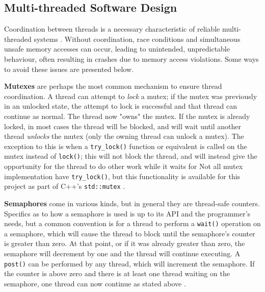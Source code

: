 \documentclass[11pt, a4paper, twocolumn]{article}
\begin{document}
\subsection{Multi-threaded Software Design}

Coordination between threads is a necessary characteristic of reliable multi-threaded systems \citep{Powell}. Without coordination, race conditions and simultaneous unsafe memory accesses can occur, leading to unintended, unpredictable behaviour, often resulting in crashes due to memory access violations. Some ways to avoid these issues are presented below.

\textbf{Mutexes} are perhaps the most common mechanism to ensure thread coordination. A thread can attempt to \emph{lock} a mutex; if the mutex was previously in an unlocked state, the attempt to lock is successful and that thread can continue as normal. The thread now "owns" the mutex. If the mutex is already locked, in most cases the thread will be blocked, and will wait until another thread \emph{unlocks} the mutex (only the owning thread can unlock a mutex). The exception to this is when a \verb|try_lock()| function or equivalent is called on the mutex instead of \verb|lock()|; this will not block the thread, and will instead give the opportunity for the thread to do other work while it waits for  Not all mutex implementation have \verb|try_lock()|, but this functionality is available for this project as part of C++'s \verb|std::mutex| \citep{CppMutex}.


\textbf{Semaphores} come in various kinds, but in general they are thread-safe counters. Specifics as to how a semaphore is used is up to its API and the programmer's needs, but a common convention is for a thread to perform a \verb|wait()| operation on a semaphore, which will cause the thread to block until the semaphore's counter is greater than zero. At that point, or if it was already greater than zero, the semaphore will decrement by one and the thread will continue executing. A \verb|post()| can be performed by any thread, which will increment the semaphore. If the counter is above zero and there is at least one thread waiting on the semaphore, one thread can now continue as stated above \citep{BoostSync}.
\end{document}
